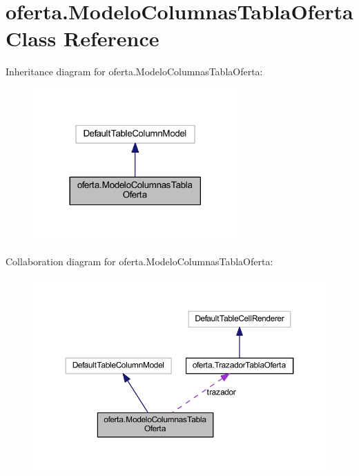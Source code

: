 \hypertarget{classoferta_1_1_modelo_columnas_tabla_oferta}{}\section{oferta.\+Modelo\+Columnas\+Tabla\+Oferta Class Reference}
\label{classoferta_1_1_modelo_columnas_tabla_oferta}


Inheritance diagram for oferta.\+Modelo\+Columnas\+Tabla\+Oferta\+:
\nopagebreak
\begin{figure}[H]
\begin{center}
\leavevmode
\includegraphics[width=222pt]{classoferta_1_1_modelo_columnas_tabla_oferta__inherit__graph}
\end{center}
\end{figure}


Collaboration diagram for oferta.\+Modelo\+Columnas\+Tabla\+Oferta\+:
\nopagebreak
\begin{figure}[H]
\begin{center}
\leavevmode
\includegraphics[width=350pt]{classoferta_1_1_modelo_columnas_tabla_oferta__coll__graph}
\end{center}
\end{figure}
